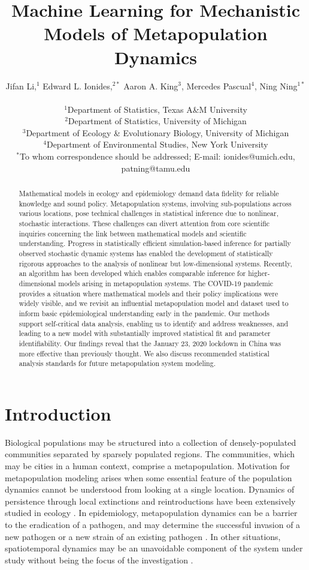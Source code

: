 \documentclass[12pt]{article}\usepackage[]{graphicx}\usepackage[]{xcolor}
\title{Machine Learning for Mechanistic Models of Metapopulation Dynamics}
\author
{Jifan Li,$^{1}$ Edward L. Ionides,$^{2\ast}$ Aaron A. King$^3$, Mercedes Pascual$^4$, Ning Ning$^{1\ast}$\\
\\
\normalsize{$^{1}$Department of Statistics, Texas A\&M University}
\\
\normalsize{$^{2}$Department of Statistics, University of Michigan}
\\
\normalsize{$^{3}$Department of Ecology \& Evolutionary Biology, University of Michigan}
\\
\normalsize{$^{4}$Department of Environmental Studies, New York University}
\\
\normalsize{$^\ast$To whom correspondence should be addressed; E-mail: ionides@umich.edu, patning@tamu.edu}
}
\date{}
\begin{document}
 



\maketitle 

\begin{abstract}
Mathematical models in ecology and epidemiology demand data fidelity for reliable knowledge and sound policy. Metapopulation systems, involving sub-populations across various locations, pose technical challenges in statistical inference due to nonlinear, stochastic interactions. These challenges can divert attention from core scientific inquiries concerning the link between mathematical models and scientific understanding. Progress in statistically efficient simulation-based inference for partially observed stochastic dynamic systems has enabled the development of statistically rigorous approaches to the analysis of nonlinear but low-dimensional systems. Recently, an algorithm has been developed which enables comparable inference for higher-dimensional models arising in metapopulation systems. The COVID-19 pandemic provides a situation where mathematical models and their policy implications were widely visible, and we revisit an influential metapopulation model and dataset used to inform basic epidemiological understanding early in the pandemic. Our methods support self-critical data analysis, enabling us to identify and address weaknesses, and leading to a new model with substantially improved statistical fit and parameter identifiability. Our findings reveal that the January 23, 2020 lockdown in China was more effective than previously thought. We also discuss recommended statistical analysis standards for future metapopulation system modeling.
\end{abstract}

\section{Introduction}
\label{sec:intro}

Biological populations may be structured into a collection of densely-populated communities separated by sparsely populated regions.
The communities, which may be cities in a human context, comprise a metapopulation.
Motivation for metapopulation modeling arises when some essential feature of the population dynamics cannot be understood from looking at a single location.
Dynamics of persistence through local extinctions and reintroductions have been extensively studied in ecology \cite{hanski98,mackenzie09}.
In epidemiology, metapopulation dynamics can be a barrier to the eradication of a pathogen, and may determine the successful invasion of a new pathogen or a new strain of an existing pathogen \cite{metcalf21}.
In other situations, spatiotemporal dynamics may be an unavoidable component of the system under study without being the focus of the investigation \cite{zhang22,wheeler23}.
\end{document}
